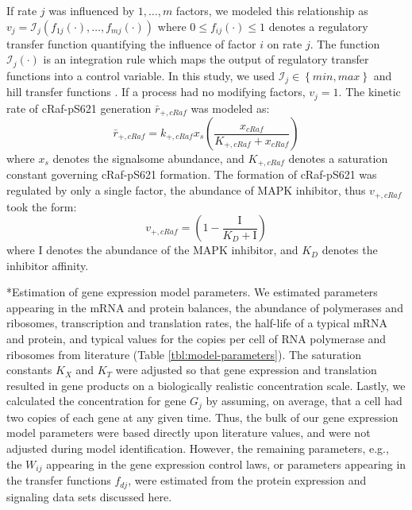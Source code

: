 \documentclass[12pt]{article}
\makeatletter
\renewcommand\subsubsection{\@startsection
	{subsubsection}{2}{0mm}
	{-0.05in}
	{-0.5\baselineskip}
	{\normalfont\normalsize\itshape}}
\makeatother
\begin{document}
If rate $j$ was influenced by $1,\dots,m$ factors, we modeled this relationship as
$v_{j}=\mathcal{I}_{j}\left(f_{1j}\left(\cdot\right),\hdots,f_{mj}\left(\cdot\right)\right)$
where $0\leq f_{ij}\left(\cdot\right)\leq 1$ denotes a regulatory transfer function quantifying the influence of factor $i$ on rate $j$.
The function $\mathcal{I}_{j}\left(\cdot\right)$ is an integration rule which maps the output of regulatory transfer functions into a control
variable. In this study, we used $\mathcal{I}_{j}\in\left\{min,max\right\}$ and hill transfer functions \cite{pr3010138}.
If a process had no modifying factors, $v_{j}=1$.
The kinetic rate of cRaf-pS621 generation $\bar{r}_{+,cRaf}$ was modeled as:
\begin{equation}
	\bar{r}_{+,cRaf} = k_{+,cRaf}x_{s}\left(\frac{x_{cRaf}}{K_{+,cRaf}+x_{cRaf}}\right)
\end{equation}where $x_{s}$ denotes the signalsome abundance, and $K_{+,cRaf}$ denotes a saturation constant governing cRaf-pS621 formation.
The formation of cRaf-pS621 was regulated by only a single factor, the abundance of MAPK inhibitor, thus $v_{+,cRaf}$ took the form:
\begin{equation}
	v_{+,cRaf} = \left(1-\frac{\mathrm{I}}{K_{D}+\mathrm{I}}\right)
\end{equation}where $\mathrm{I}$ denotes the abundance of the MAPK inhibitor, and $K_{D}$ denotes the inhibitor affinity.

\noindent\subsubsection*{Estimation of gene expression model parameters.}
We estimated parameters appearing in the mRNA and protein balances, the abundance of polymerases and ribosomes,
transcription and translation rates, the half-life of a typical mRNA and protein,
and typical values for the copies per cell of RNA polymerase and ribosomes from literature (Table \ref{tbl:model-parameters}).
The saturation constants $K_{X}$ and $K_{T}$ were adjusted so that gene expression and translation resulted in gene products on a biologically realistic concentration scale.
Lastly, we calculated the concentration for gene $G_{j}$ by assuming, on average, that a cell had two copies of each gene at any given time.
Thus, the bulk of our gene expression model parameters were based directly upon literature values, and were not adjusted during model identification.
However, the remaining parameters, e.g., the $W_{ij}$ appearing in the gene expression control laws,
or parameters appearing in the transfer functions $f_{dj}$, were estimated from the protein expression and signaling data sets discussed here.
\end{document}
